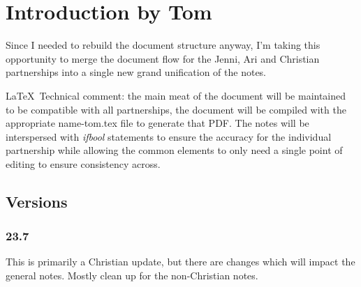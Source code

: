 \documentclass[main]{subfile}
\begin{document}
\chapter{Introduction by Tom}

Since I needed to rebuild the document structure anyway, I'm taking this opportunity to merge the document flow for the Jenni, Ari and Christian partnerships into a single new grand unification of the notes.  

\LaTeX ~Technical comment:  the main meat of the document will be maintained to be compatible with all partnerships, the document will be compiled with the appropriate name-tom.tex file to generate that PDF.  The notes will be interspersed with \textit{ifbool} statements to ensure the accuracy for the individual partnership while allowing the common elements to only need a single point of editing to ensure consistency across.

\section{Versions}
\subsection{23.7}
This is primarily a Christian update, but there are changes which will impact the general notes.  Mostly clean up for the non-Christian notes.
\end{document}
